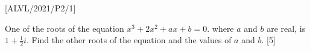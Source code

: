 \item {[}ALVL/2021/P2/1{]}

One of the roots of the equation $x^{3}+2x^{2}+ax+b=0$. where $a$
and $b$ are real, is $1+\frac{1}{2}i$. Find the other roots of the
equation and the values of $a$ and $b$. \hfill{}{[}5{]}
